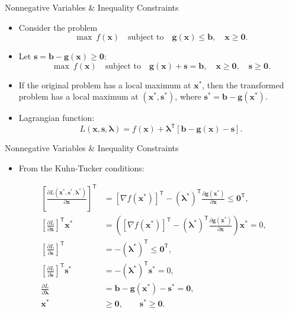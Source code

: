 \documentclass[aspectratio=169,hyperref,UTF8,CJK]{beamer}
\newcommand{\trans}{\mathsf{T}}
\newcommand{\vect}[1]{\boldsymbol{#1}}
\begin{document}
\begin{frame}{Nonnegative Variables \& Inequality Constraints}
  \small
  \begin{itemize}
    \item Consider the problem
      \begin{equation*}
        \max\ f(\vect{x})\quad\text{subject to}\quad
        \vect{g}(\vect{x})\le\vect{b},\quad\vect{x}\ge\vect{0}.
      \end{equation*}
    \item Let $\vect{s}=\vect{b}-\vect{g}(\vect{x})\ge\vect{0}$:
      \begin{equation*}
        \max\ f(\vect{x})\quad\text{subject to}\quad
        \vect{g}(\vect{x})+\vect{s}=\vect{b},\quad
        \vect{x}\ge\vect{0},\quad\vect{s}\ge\vect{0}.
      \end{equation*}
    \item If the original problem has a local maximum at $\vect{x}^{*}$, then the transformed problem has a local maximum at $(\vect{x}^{*},\vect{s}^{*})$, where $\vect{s}^{*}=\vect{b}-\vect{g}(\vect{x}^{*})$.
    \item Lagrangian function:
      \begin{equation*}
        L(\vect{x},\vect{s},\vect{\lambda})
        =f(\vect{x})+\vect{\lambda}^{\trans}[\vect{b}-\vect{g}(\vect{x})-\vect{s}].
      \end{equation*}
  \end{itemize}
\end{frame}

\begin{frame}{Nonnegative Variables \& Inequality Constraints}
  \scriptsize
  \begin{itemize}
    \item From the Kuhn-Tucker conditions:
  \end{itemize}
  \begin{align*}
    \left[\frac{\partial L(\vect{x}^{*},\vect{s}^{*},\vect{\lambda}^{*})}{\partial\vect{x}}\right]^{\trans}
      &=[\nabla f(\vect{x}^{*})]^{\trans}-(\vect{\lambda}^{*})^{\trans}
        \frac{\partial\vect{g}(\vect{x}^{*})}{\partial\vect{x}}\le\vect{0}^{\trans},\\
    \left[\frac{\partial L}{\partial\vect{x}}\right]^{\trans}\vect{x}^{*}
      &=\left([\nabla f(\vect{x}^{*})]^{\trans}-(\vect{\lambda}^{*})^{\trans}
        \frac{\partial\vect{g}(\vect{x}^{*})}{\partial\vect{x}}\right)\vect{x}^{*}=0,\\
    \left[\frac{\partial L}{\partial\vect{s}}\right]^{\trans}
      &=-(\vect{\lambda}^{*})^{\trans}\le\vect{0}^{\trans},\\
    \left[\frac{\partial L}{\partial\vect{s}}\right]^{\trans}\vect{s}^{*}
      &=-(\vect{\lambda}^{*})^{\trans}\vect{s}^{*}=0,\\
    \frac{\partial L}{\partial\vect{\lambda}}
      &=\vect{b}-\vect{g}(\vect{x}^{*})-\vect{s}^{*}=\vect{0},\\
    \vect{x}^{*}&\ge\vect{0},\qquad \vect{s}^{*}\ge\vect{0}.
  \end{align*}
\end{frame}
\end{document}
